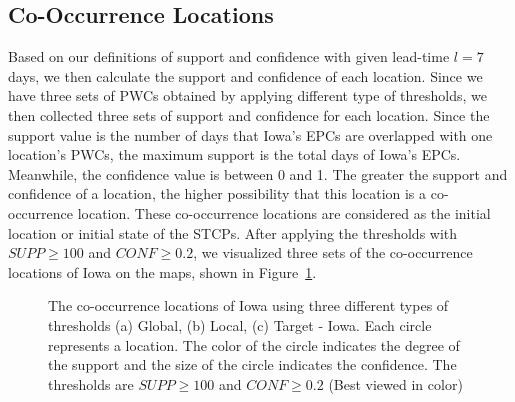 \documentclass{acm_proc_article-sp}
\begin{document}
\subsection{Co-Occurrence Locations}
Based on our definitions of support and confidence with given lead-time $l=7$ days, we then calculate the support and confidence of each location. Since we have three sets of PWCs obtained by applying different type of thresholds, we then collected three sets of support and confidence for each location. Since the support value is the number of days that Iowa's EPCs are overlapped with one location's PWCs, the maximum support is the total days of Iowa's EPCs. Meanwhile, the confidence value is between 0 and 1. The greater the support and confidence of a location, the higher possibility that this location is a co-occurrence location. These co-occurrence locations are considered as the initial location or initial state of the STCPs. After applying the thresholds with $SUPP \geq 100$ and $CONF \geq 0.2$, we visualized three sets of the co-occurrence locations of Iowa on the maps, shown in Figure~\ref{fig:co-locations}. 

\begin{figure}  
\begin{center}  
\caption{The co-occurrence locations of Iowa using three different types of thresholds (a) Global, (b) Local, (c) Target - Iowa. Each circle represents a location. The color of the circle indicates the degree of the support and the size of the circle indicates the confidence. The thresholds are $SUPP \geq 100$ and $CONF \geq 0.2$ (Best viewed in color) \label{fig:co-locations}}  
\end{center}  
\end{figure}
\end{document}
